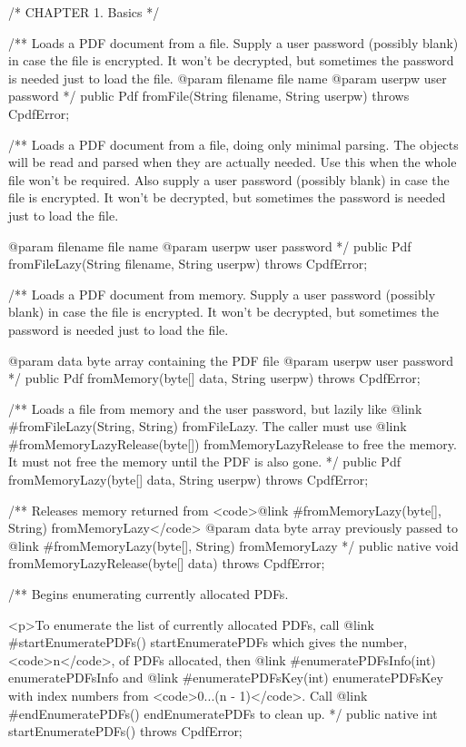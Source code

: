 /* CHAPTER 1. Basics */

/** Loads a PDF document from a file. Supply
a user password (possibly blank) in case the file is encrypted. It won't be
decrypted, but sometimes the password is needed just to load the file.
@param filename file name
@param userpw user password */
public Pdf fromFile(String filename, String userpw) throws CpdfError;

/** Loads a PDF document from a file, doing only minimal
parsing. The objects will be read and parsed when they are actually
needed. Use this when the whole file won't be required. Also supply a user
password (possibly blank) in case the file is encrypted. It won't be
decrypted, but sometimes the password is needed just to load the file.

@param filename file name
@param userpw user password */
public Pdf fromFileLazy(String filename, String userpw) throws CpdfError;

/** Loads a PDF document from memory. Supply
a user password (possibly blank) in case the file is encrypted. It won't be
decrypted, but sometimes the password is needed just to load the file.

@param data byte array containing the PDF file
@param userpw user password */
public Pdf fromMemory(byte[] data, String userpw) throws CpdfError;

/** Loads a file from memory and the user
password, but lazily like {@link #fromFileLazy(String, String)
fromFileLazy}. The caller must use {@link #fromMemoryLazyRelease(byte[])
fromMemoryLazyRelease} to free the memory. It must not free the memory
until the PDF is also gone. */
public Pdf fromMemoryLazy(byte[] data, String userpw) throws CpdfError;

/** Releases memory returned from
<code>{@link #fromMemoryLazy(byte[], String) fromMemoryLazy}</code>
@param data byte array previously passed to {@link #fromMemoryLazy(byte[],
String) fromMemoryLazy} */
public native void fromMemoryLazyRelease(byte[] data) throws CpdfError;

/** Begins enumerating currently allocated PDFs.

<p>To enumerate the list of currently allocated PDFs, call
{@link #startEnumeratePDFs() startEnumeratePDFs} which gives the number, 
<code>n</code>, of PDFs allocated, then {@link #enumeratePDFsInfo(int)
enumeratePDFsInfo} and {@link #enumeratePDFsKey(int) enumeratePDFsKey} with
index numbers from <code>0...(n - 1)</code>. Call
{@link #endEnumeratePDFs() endEnumeratePDFs} to clean up. */
public native int startEnumeratePDFs() throws CpdfError;

